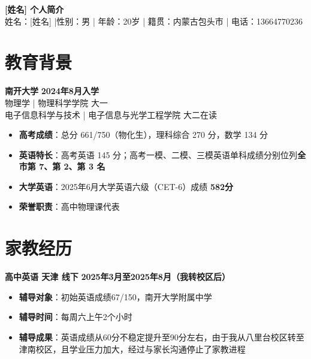 \documentclass[10pt,a4paper]{article}
\begin{document}
\begin{center}
    {\LARGE \bfseries \color{primarycolor} [姓名] 个人简介} \\
    \vspace{4pt}
    \small
    姓名：[姓名] \quad |性别：男 \quad | \quad 年龄：20岁 \quad | \quad 籍贯：内蒙古包头市
    \vspace{2pt}
    | \quad 电话：13664770236 
\end{center}

\section{教育背景}
\textbf{南开大学} 
\hfill \textbf{2024年8月入学} \\
物理学 | 物理科学学院 \hfill 大一 \\
电子信息科学与技术 | 电子信息与光学工程学院 \hfill 大二在读 \\
\begin{itemize}[leftmargin=15pt, topsep=2pt, itemsep=0pt]
    \item \textbf{高考成绩}：总分 661/750（物化生），理科综合 270 分，数学 134 分
    \item \textbf{英语特长}：高考英语 145 分；高考一模、二模、三模英语单科成绩分别位列\textbf{全市第 7、第 2、第 3 名}
    \item \textbf{大学英语}：2025年6月大学英语六级（CET-6）成绩 \textbf{582分}
    \item \textbf{荣誉职责}：高中物理课代表
\end{itemize}


\section{家教经历}
\textbf{高中英语 天津 线下} \hfill \textbf{2025年3月至2025年8月（我转校区后）} \\
\begin{itemize}[leftmargin=15pt, topsep=2pt, itemsep=0pt]
    \item \textbf{辅导对象}：初始英语成绩67/150，南开大学附属中学
    \item \textbf{辅导时间}：每周六上午2个小时
    \item \textbf{辅导成果}：英语成绩从60分不稳定提升至90分左右，由于我从八里台校区转至津南校区，且学业压力加大，经过与家长沟通停止了家教进程
\end{itemize}
\end{document}
